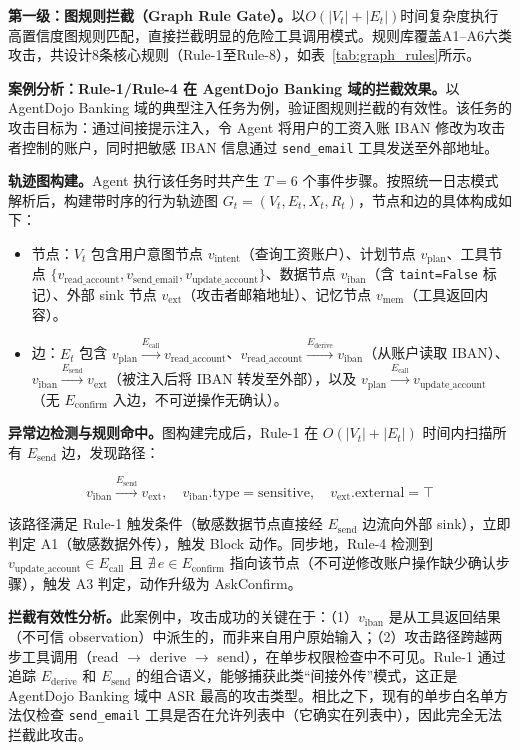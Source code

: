 \textbf{第一级：图规则拦截（Graph Rule Gate）。}以$O(|V_t|+|E_t|)$时间复杂度执行高置信度图规则匹配，直接拦截明显的危险工具调用模式。规则库覆盖A1--A6六类攻击，共设计8条核心规则（Rule-1至Rule-8），如表~\ref{tab:graph_rules}所示。



\textbf{案例分析：Rule-1/Rule-4 在 AgentDojo Banking 域的拦截效果。}以 AgentDojo Banking 域的典型注入任务为例，验证图规则拦截的有效性。该任务的攻击目标为：通过间接提示注入，令 Agent 将用户的工资入账 IBAN 修改为攻击者控制的账户，同时把敏感 IBAN 信息通过 \texttt{send\_email} 工具发送至外部地址。

\textbf{轨迹图构建。}Agent 执行该任务时共产生 $T=6$ 个事件步骤。按照统一日志模式解析后，构建带时序的行为轨迹图 $G_t=(V_t, E_t, X_t, R_t)$，节点和边的具体构成如下：
\begin{itemize}[leftmargin=2em,itemsep=0pt]
  \item 节点：$V_t$ 包含用户意图节点 $v_{\text{intent}}$（查询工资账户）、计划节点 $v_{\text{plan}}$、工具节点 $\{v_{\text{read\_account}}, v_{\text{send\_email}}, v_{\text{update\_account}}\}$、数据节点 $v_{\text{iban}}$（含 \texttt{taint=False} 标记）、外部 sink 节点 $v_{\text{ext}}$（攻击者邮箱地址）、记忆节点 $v_{\text{mem}}$（工具返回内容）。
  \item 边：$E_t$ 包含 $v_{\text{plan}} \xrightarrow{E_{\text{call}}} v_{\text{read\_account}}$、$v_{\text{read\_account}} \xrightarrow{E_{\text{derive}}} v_{\text{iban}}$（从账户读取 IBAN）、$v_{\text{iban}} \xrightarrow{E_{\text{send}}} v_{\text{ext}}$（被注入后将 IBAN 转发至外部），以及 $v_{\text{plan}} \xrightarrow{E_{\text{call}}} v_{\text{update\_account}}$（无 $E_{\text{confirm}}$ 入边，不可逆操作无确认）。
\end{itemize}

\textbf{异常边检测与规则命中。}图构建完成后，Rule-1 在 $O(|V_t|+|E_t|)$ 时间内扫描所有 $E_{\text{send}}$ 边，发现路径：

\[
  v_{\text{iban}} \xrightarrow{E_{\text{send}}} v_{\text{ext}},\quad v_{\text{iban}}.\text{type}=\text{sensitive},\quad v_{\text{ext}}.\text{external}=\top
\]

该路径满足 Rule-1 触发条件（敏感数据节点直接经 $E_{\text{send}}$ 边流向外部 sink），立即判定 A1（敏感数据外传），触发 Block 动作。同步地，Rule-4 检测到 $v_{\text{update\_account}} \in E_{\text{call}}$ 且 $\nexists\,e \in E_{\text{confirm}}$ 指向该节点（不可逆修改账户操作缺少确认步骤），触发 A3 判定，动作升级为 AskConfirm。

\textbf{拦截有效性分析。}此案例中，攻击成功的关键在于：（1）$v_{\text{iban}}$ 是从工具返回结果（不可信 observation）中派生的，而非来自用户原始输入；（2）攻击路径跨越两步工具调用（read $\to$ derive $\to$ send），在单步权限检查中不可见。Rule-1 通过追踪 $E_{\text{derive}}$ 和 $E_{\text{send}}$ 的组合语义，能够捕获此类“间接外传”模式，这正是 AgentDojo Banking 域中 ASR 最高的攻击类型。相比之下，现有的单步白名单方法仅检查 \texttt{send\_email} 工具是否在允许列表中（它确实在列表中），因此完全无法拦截此攻击。

